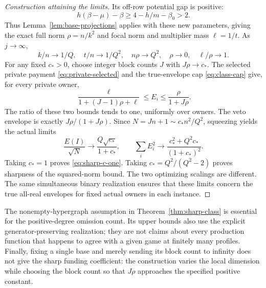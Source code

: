 \documentclass[11pt]{article}
\theoremstyle{definition}
\theoremstyle{remark}
\begin{document}
\begin{proof}[Construction attaining the limits]
Its off-row potential gap is positive:
\[
 h(\beta-\mu)-\beta
       \ge4-h/m-\beta_0>2.
\]
Thus Lemma~\ref{lem:base-projections} applies with these new parameters,
giving the exact full norm $\rho=n/k^2$ and focal norm and multiplier
mass $\ell=1/t$.  As $j\to\infty$,
\[
 k/n\longrightarrow1/Q,\quad t/n\longrightarrow1/Q^2,\quad
 n\rho\longrightarrow Q^2,\quad \rho\longrightarrow0,\quad
 \ell/\rho\longrightarrow1.
\]
For any fixed $c_*>0$, choose integer block counts $J$ with
$J\rho\to c_*$.  The selected private payment
\eqref{eq:private-selected} and the true-envelope cap
\eqref{eq:class-cap} give, for every private owner,
\[
 \frac{\ell}{1+(J-1)\rho+\ell}
       \le E_i\le\frac{\rho}{1+J\rho}.
\]
The ratio of these two bounds tends to one, uniformly over owners.
The veto envelope is exactly $J\rho/(1+J\rho)$.
Since $N=Jn+1\sim c_*n^2/Q^2$, squeezing yields the actual limits
\[
 \frac{E(I)}{\sqrt N}\longrightarrow
         \frac{Q\sqrt{c_*}}{1+c_*},\qquad
 \sum_i E_i^2\longrightarrow
         \frac{c_*^2+Q^2c_*}{(1+c_*)^2}.
\]
Taking $c_*=1$ proves \eqref{eq:sharp-c-one}.  Taking
$c_*=Q^2/(Q^2-2)$ proves sharpness of the squared-norm bound.
The two optimizing scalings are different.  The same simultaneous
binary realization ensures that these limits concern the true
all-real envelopes for fixed actual owners in each instance.
\end{proof}

The nonempty-hypergraph assumption in Theorem~\ref{thm:sharp-class} is
essential for the positive-degree omission count.  Its upper bounds
also use the explicit generator-preserving realization; they are not
claims about every production function that happens to agree with a
given game at finitely many profiles.  Finally, fixing a single base
and merely sending its block count to infinity does not give the sharp
funding coefficient: the construction varies the local dimension while
choosing the block count so that $J\rho$ approaches the specified
positive constant.
\end{document}
